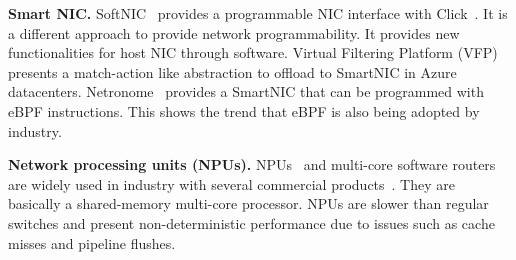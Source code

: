 \textbf{Smart NIC.} 
SoftNIC~\cite{Han:EECS-2015-155} provides a programmable NIC interface with Click~\cite{Kohler:2000:CMR:354871.354874}. It is a different approach to provide network programmability. It provides new functionalities for host NIC through software.
Virtual  Filtering  Platform  (VFP)~\cite{VFP2017} presents a match-action like abstraction to offload to SmartNIC in Azure datacenters.
Netronome~\cite{Netronome2018} provides a SmartNIC that can be programmed with eBPF instructions. This shows the trend that eBPF is also being adopted by industry. 

\textbf{Network processing units (NPUs).} NPUs~\cite{Sherwood:2003:PMA:859618.859652,Keslassy:2012:PPG:2428663.2428680} 
and multi-core software routers~\cite{Dobrescu:2009:REP:1629575.1629578} are widely used in industry with several commercial products~\cite{intel, cisco, micro, mellanox}. They are basically a shared-memory multi-core processor.  NPUs are slower than regular switches and present non-deterministic performance due to issues such as cache misses and pipeline flushes. 





